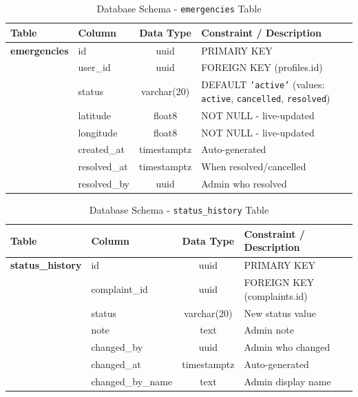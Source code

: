\documentclass[12pt, a4paper, twoside, openany]{report}
\begin{document}
\begin{table}[ht]
\centering
\caption{Database Schema - \texttt{emergencies} Table}
\label{tab:emergencies}
\begin{tabularx}{\textwidth}{p{3cm} p{3cm} c X}
\toprule
\textbf{Table} & \textbf{Column} & \textbf{Data Type} & \textbf{Constraint / Description} \\
\midrule
\textbf{emergencies} & id & uuid & PRIMARY KEY \\
& user\_id & uuid & FOREIGN KEY (profiles.id) \\
& status & varchar(20) & DEFAULT \texttt{'active'} (values: \texttt{active}, \texttt{cancelled}, \texttt{resolved}) \\
& latitude & float8 & NOT NULL - live-updated \\
& longitude & float8 & NOT NULL - live-updated \\
& created\_at & timestamptz & Auto-generated \\
& resolved\_at & timestamptz & When resolved/cancelled \\
& resolved\_by & uuid & Admin who resolved \\
\bottomrule
\end{tabularx}
\end{table}
\begin{table}[ht]
\centering
\caption{Database Schema - \texttt{status\_history} Table}
\label{tab:status_history}
\begin{tabularx}{\textwidth}{p{3cm} p{3cm} c X}
\toprule
\textbf{Table} & \textbf{Column} & \textbf{Data Type} & \textbf{Constraint / Description} \\
\midrule
\textbf{status\_history} & id & uuid & PRIMARY KEY \\
& complaint\_id & uuid & FOREIGN KEY (complaints.id) \\
& status & varchar(20) & New status value \\
& note & text & Admin note \\
& changed\_by & uuid & Admin who changed \\
& changed\_at & timestamptz & Auto-generated \\
& changed\_by\_name & text & Admin display name \\
\bottomrule
\end{tabularx}
\end{table}
\end{document}
